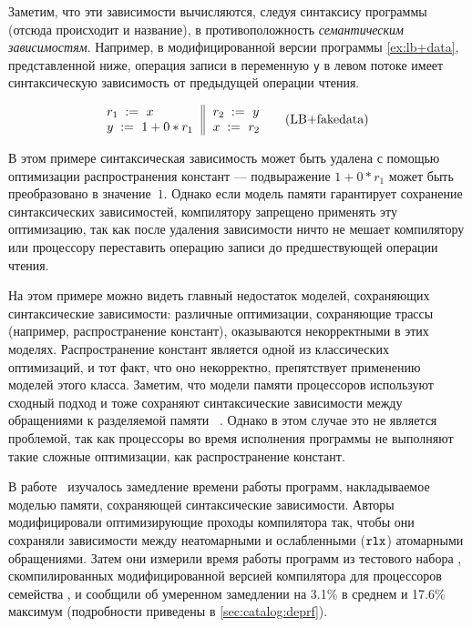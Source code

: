 Заметим, что эти зависимости вычисляются, следуя 
синтаксису программы (отсюда происходит и название), 
в противоположность \emph{семантическим зависимостям}. 
Например, в модифицированной версии 
программы \ref{ex:lb+data}, представленной ниже, 
операция записи в переменную \texttt{y} в левом потоке имеет синтаксическую зависимость от предыдущей операции чтения. 

\begin{equation*}
\inarrII{
  \readInst{}{r_1}{x}           \\
  \writeInst{}{y}{1 + 0 * r_1}  \\
}{
  \readInst{}{r_2}{y}      \\
  \writeInst{}{x}{r_2}     \\
}
\tag{LB+fakedata}\label{ex:lb+fakedata}
\end{equation*}

В этом примере синтаксическая зависимость может быть удалена
с помощью оптимизации распространения констант ---
подвыражение $1 + 0 * r_1$ может быть преобразовано в значение~$1$.
Однако если модель памяти гарантирует сохранение синтаксических зависимостей,
компилятору запрещено применять эту оптимизацию, 
так как после удаления зависимости ничто не мешает компилятору или процессору 
переставить операцию записи до предшествующей операции чтения.  

На этом примере можно видеть главный недостаток моделей, 
сохраняющих синтаксические зависимости: 
различные оптимизации, сохраняющие трассы
(например, распространение констант), оказываются некорректными в этих моделях. 
Распространение констант является одной из 
классических оптимизаций, и тот факт, 
что оно некорректно, препятствует применению 
моделей этого класса. 
Заметим, что модели памяти процессоров 
используют сходный подход и тоже 
сохраняют синтаксические зависимости 
между обращениями к разделяемой памяти%
~\cite{Sarkar-al:PLDI11, Alglave-al:TOPLAS14, Pulte-al:POPL18}.
Однако в этом случае это не является проблемой, 
так как процессоры во время исполнения программы 
не выполняют такие сложные оптимизации, 
как распространение констант.

В работе~\cite{Ou-Demsky:OOPSLA18} изучалось 
замедление времени работы программ, накладываемое моделью памяти, 
сохраняющей синтаксические зависимости. 
Авторы модифицировали оптимизирующие проходы компилятора так, 
чтобы они сохраняли зависимости между 
неатомарными и ослабленными ($\mathtt{rlx}$) атомарными обращениями. 
Затем они измерили время работы программ из тестового набора \SPECCPU,
скомпилированных модифицированной версией компилятора \LLVM 
для процессоров семейства , и сообщили 
об умеренном замедлении на 3.1\% в среднем и 17.6\% максимум
(подробности приведены в \ref{sec:catalog:deprf}). 


